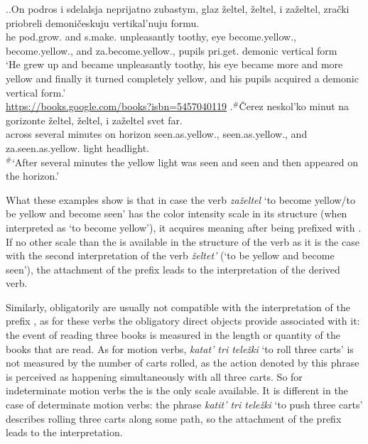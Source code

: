 \ex.\label{ex:zazeltet:test}\ag.\label{ex:zazeltet:test1}On podros i sdelalsja neprijatno zubastym, glaz \v{z}eltel, \v{z}eltel, i za\v{z}eltel, zra\v{c}ki priobreli demoni\v{c}eskuju vertikal'nuju formu.\\
he pod.grow. and s.make. unpleasantly toothy, eye become.yellow., become.yellow., and za.become.yellow., pupils pri.get. demonic vertical form\\
\trans `He grew up and became unpleasantly toothy, his eye became more and more yellow and finally it turned completely yellow, and his pupils acquired a demonic vertical form.'\\\hbox{}\hfill\hbox{\url{https://books.google.com/books?isbn=5457040119}}
\bg.$^\#$\v{C}erez neskol'ko minut na gorizonte \v{z}eltel, \v{z}eltel, i za\v{z}eltel svet far.\label{ex:zazeltet:test2}\\
across several minutes on horizon seen.as.yellow., seen.as.yellow., and za.seen.as.yellow. light headlight.\\
\trans $^\#$`After several minutes the yellow light was seen and seen and then appeared on the horizon.'

What these examples show is that in case the verb \textit{za\v{z}eltel} `to become yellow/to be yellow and become seen' has the color intensity scale in its structure (when interpreted as `to become yellow'), it acquires  meaning after being prefixed with . If no other scale than the  is available in the structure of the verb as it is the case with the second interpretation of the verb \textit{\v{z}eltet'} (`to be yellow and become seen'), the attachment of the prefix  leads to the  interpretation of the derived verb.

Similarly, obligatorily  are usually not compatible with the  interpretation of the prefix , as for these verbs the obligatory direct objects provide  associated with it: the event of reading three books is measured in the  length or quantity of the books that are read. As for motion verbs, \textit{katat' tri tele\v{z}ki} `to roll three carts' is not measured by the number of carts rolled, as the action denoted by this phrase is perceived as happening simultaneously with all three carts. So for indeterminate motion verbs the  is the only scale available. It is different in the case of determinate motion verbs: the phrase \textit{katit' tri tele\v{z}ki} `to push three carts' describes rolling three carts along some path, so the attachment of the prefix  leads to the  interpretation.

